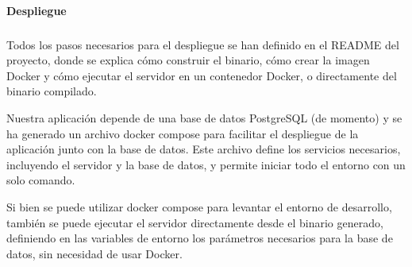 \paragraph{Despliegue}
\subparagraph{}

Todos los pasos necesarios para el despliegue se han definido en el README del proyecto, donde se explica cómo construir el binario, cómo crear la imagen Docker y cómo ejecutar el servidor en un contenedor Docker, o directamente del binario compilado.

Nuestra aplicación depende de una base de datos PostgreSQL (de momento) y se ha generado un archivo docker compose para facilitar el despliegue de la aplicación junto con la base de datos. Este archivo define los servicios necesarios, incluyendo el servidor y la base de datos, y permite iniciar todo el entorno con un solo comando.

Si bien se puede utilizar docker compose para levantar el entorno de desarrollo, también se puede ejecutar el servidor directamente desde el binario generado, definiendo en las variables de entorno los parámetros necesarios para la base de datos, sin necesidad de usar Docker.
